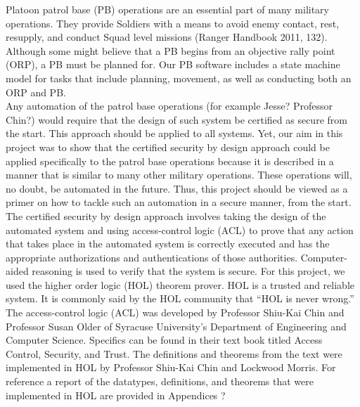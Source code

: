 Platoon patrol base (PB) operations are an essential part of many military operations.
They provide Soldiers with a means to avoid enemy contact, rest, resupply, and conduct Squad
level missions (Ranger Handbook 2011, 132). Although some might believe that a PB begins from
an objective rally point (ORP), a PB must be planned for. Our PB software includes a state
machine model for tasks that include planning, movement, as well as conducting both an ORP and PB.\\

Any automation of the patrol base operations (for example Jesse? Professor Chin?) would require
that the design of such system be certified as secure from the start. This approach should be
applied to all systems. Yet, our aim in this project was to show that the certified security by
design approach could be applied specifically to the patrol base operations because it is described
in a manner that is similar to many other military operations. These operations will, no doubt,
be automated in the future. Thus, this project should be viewed as a primer on how to tackle such
an automation in a secure manner, from the start.\\

The certified security by design approach involves taking the design of the automated system and
using access-control logic (ACL) to prove that any action that takes place in the automated system
is correctly executed and has the appropriate authorizations and authentications of those authorities.
Computer-aided reasoning is used to verify that the system is secure. For this project, we used the
higher order logic (HOL) theorem prover. HOL is a trusted and reliable system. It is commonly said by
the HOL community that “HOL is never wrong.”\\

The access-control logic (ACL) was developed by Professor Shiu-Kai Chin and Professor Susan Older of
Syracuse University’s Department of Engineering and Computer Science. Specifics can be found in their
text book titled Access Control, Security, and Trust. The definitions and theorems from the text were
implemented in HOL by Professor Shiu-Kai Chin and Lockwood Morris. For reference a report of the datatypes,
definitions, and theorems that were implemented in HOL are provided in Appendices ?\\

